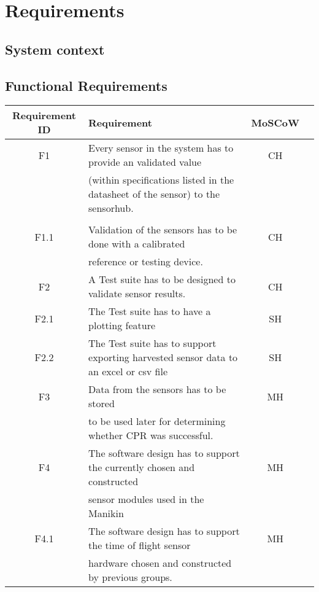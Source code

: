 \chapter{Requirements}
\label{chapter:intro}
\section{System context}

\section{Functional Requirements}
\begin{tabular}{ |c|l|c|c| } 
 \hline
 Requirement ID & Requirement & MoSCoW \\ 
 \hline
 \hline
 F1    & Every sensor in the system has to provide an validated value  & CH \\ 
       & (within specifications listed in the datasheet of the sensor) to the sensorhub.  &  \\
       &                                                                                  &  \\
\hline
 F1.1  & Validation of the sensors has to be done with a calibrated                       & CH \\
       & reference or testing device.                                                     &   \\
\hline
 F2    & A Test suite has to be designed to validate sensor results.                      & CH \\
 \hline
 F2.1  & The Test suite has to have a plotting feature                                    & SH \\
 \hline 
 F2.2  & The Test suite has to support exporting harvested sensor data to an excel or csv file & SH \\
 \hline
 F3    & Data from the sensors has to be stored & MH\\
       & to be used later for determining whether CPR was successful.  & \\
\hline
 F4    & The software design has to support the currently chosen and constructed & MH  \\
       & sensor modules used in the Manikin & \\
 \hline
 F4.1  & The software design has to support the time of flight sensor & MH \\
       & hardware chosen and constructed by previous groups. & \\
\hline

\end{tabular}
